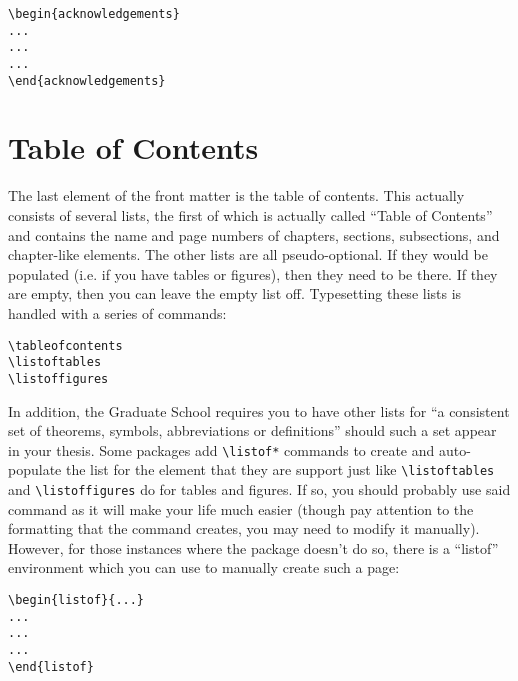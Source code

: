 \begin{verbatim}
\begin{acknowledgements}
...
...
...
\end{acknowledgements}
\end{verbatim}

\section{Table of Contents}
The last element of the front matter is the table of contents.  This actually consists of several lists, the first of which is actually called ``Table of Contents'' and contains the name and page numbers of chapters, sections, subsections, and chapter-like elements.  The other lists are all pseudo-optional.  If they would be populated (i.e. if you have tables or figures), then they need to be there.  If they are empty, then you can leave the empty list off.  Typesetting these lists is handled with a series of commands:

\begin{verbatim}
\tableofcontents
\listoftables
\listoffigures
\end{verbatim}

In addition, the Graduate School requires you to have other lists for ``a consistent set of theorems, symbols, abbreviations or definitions'' should such a set appear in your thesis.  Some packages add \verb=\listof*= commands to create and auto-populate the list for the element that they are support just like \verb=\listoftables= and \verb=\listoffigures= do for tables and figures.  If so, you should probably use said command as it will make your life much easier (though pay attention to the formatting that the command creates, you may need to modify it manually).  However, for those instances where the package doesn't do so, there is a ``listof'' environment which you can use to manually create such a page:

\begin{verbatim}
\begin{listof}{...}
...
...
...
\end{listof}
\end{verbatim}

